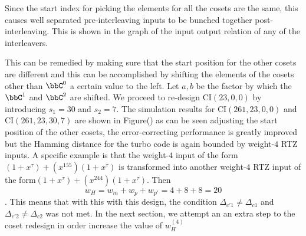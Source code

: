 Since the start index for picking the elements for all the cosets are the same, this causes well separated pre-interleaving inputs to be bunched together post-interleaving. This is shown in the graph of the input output relation of any of the interleavers.

This can be remedied by making sure that the start position for the other cosets are different and this can be accomplished by shifting the elements of the cosets other than $\bbC^0$ a certain value to the left. Let $a,b$ be the factor by which the $\bbC^1$ and $\bbC^2$ are shifted.  We proceed to re-design  CI$(23,0,0)$  by introducing $s_1=30$ and $s_2=7$.
The simulation results for CI$(261,23,0,0)$ and CI$(261,23,30,7)$ are shown in Figure() as can be seen adjusting the start position of the other cosets, the error-correcting performance is greatly improved but the Hamming distance for the turbo code is again bounded by weight-$4$ RTZ inputs. A specific example is that the weight-$4$ input of the form $(1+x^{\tau})+(x^{155})(1+x^{\tau})$ is transformed into another weight-$4$ RTZ input of the form$ (1+x^{\tau})+(x^{244})(1+x^{\tau})$. Then $$w_H=w_m+w_p+w_{p'}=4+8+8=20$$. This means that with this with this design, the condition $\Delta_{c'1} \neq \Delta_{c1}$ and $\Delta_{c'2} \neq \Delta_{c2}$ was not met.
In the next section, we attempt an an extra step to the coset redesign in order increase the value of $w^{(4)}_H$